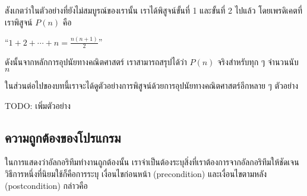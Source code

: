 สังเกต{\wbr}ว่า{\wbr}ใน{\wbr}ตัวอย่าง{\wbr}ที่{\wbr}ยัง{\wbr}ไม่{\wbr}สมบูรณ์{\wbr}ของ{\wbr}เรา{\wbr}นั้น เรา{\wbr}ได้{\wbr}พิสูจน์{\wbr}ขั้น{\wbr}ที่ 1 และ{\wbr}ขั้น{\wbr}ที่ 2 ไป{\wbr}แล้ว{\wbr}
โดย{\wbr}เพรดิเคต{\wbr}ที่{\wbr}เรา{\wbr}พิสูจน์ $ P(n) $ คือ{\wbr}

\begin{center}
``$ 1+2+\cdots+n = \frac{n(n+1)}{2} $''
\end{center}

ดังนั้น{\wbr}จาก{\wbr}หลักการ{\wbr}อุปนัย{\wbr}ทาง{\wbr}คณิตศาสตร์ เรา{\wbr}สามารถ{\wbr}สรุป{\wbr}ได้{\wbr}ว่า $ P(n) $ จริง{\wbr}สำหรับ{\wbr}ทุก ๆ
จำนวนนับ $ n $

ใน{\wbr}ส่วนต่อ{\wbr}ไป{\wbr}ของ{\wbr}บท{\wbr}นี้{\wbr}เรา{\wbr}จะ{\wbr}ได้{\wbr}ดู{\wbr}ตัวอย่าง{\wbr}การ{\wbr}พิสูจน์{\wbr}ด้วย{\wbr}การ{\wbr}อุปนัย{\wbr}ทาง{\wbr}คณิตศาสตร์{\wbr}อีก{\wbr}หลาย ๆ
ตัวอย่าง{\wbr}

TODO: เพิ่ม{\wbr}ตัวอย่าง{\wbr}

\subsection{ความ{\wbr}ถูกต้อง{\wbr}ของ{\wbr}โปรแกรม}

ใน{\wbr}การ{\wbr}แสดง{\wbr}ว่า{\wbr}อัล{\wbr}กอ{\wbr}ริ{\wbr}ทึม{\wbr}ทำงาน{\wbr}ถูกต้อง{\wbr}นั้น{\wbr}
เรา{\wbr}จำเป็น{\wbr}ต้อง{\wbr}ระบุ{\wbr}สิ่ง{\wbr}ที่{\wbr}เรา{\wbr}ต้องการ{\wbr}จาก{\wbr}อัล{\wbr}กอ{\wbr}ริ{\wbr}ทึม{\wbr}ให้{\wbr}ชัดเจน วิธีการ{\wbr}หนึ่ง{\wbr}ที่{\wbr}นิยม{\wbr}ใช้{\wbr}ก็{\wbr}คือ{\wbr}การ{\wbr}ระบุ เงื่อนไข{\wbr}ก่อนหน้า (precondition) และ{\wbr}เงื่อนไข{\wbr}ตาม{\wbr}หลัง (postcondition) กล่าวคือ{\wbr}

